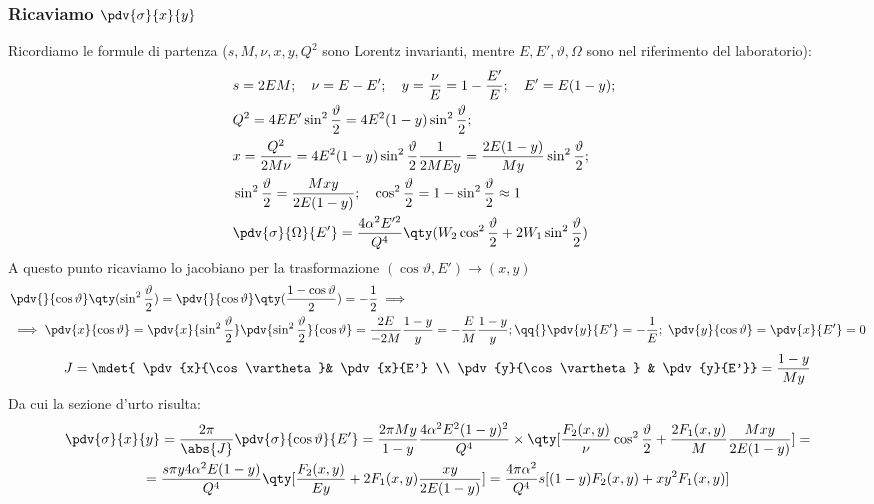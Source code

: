 \subsubsection{Ricaviamo $\pdv{\sigma}{x}{y}$}
Ricordiamo le formule di partenza ($s,M,\nu,x,y,Q^2$ sono Lorentz invarianti, mentre $E,E',\vartheta,\Omega$ sono nel riferimento del laboratorio):
\begin{align*}
&s=2EM;\quad\nu=E-E';\quad y=\frac{\nu}{E}=1-\frac{E'}{E};\quad E'=E(1-y);\\
&Q^2=4EE'\sin^2\frac{\vartheta}{2}=4E^2(1-y)\sin^2\frac{\vartheta}{2};\\
&x=\frac{Q^2}{2M\nu}=4E^2(1-y)\sin^2\frac{\vartheta}{2}\frac{1}{2MEy}=\frac{2E(1-y)}{My}\sin^2\frac{\vartheta}{2};\\
&\sin^2\frac{\vartheta}{2}=\frac{Mxy}{2E(1-y)};\quad\cos^2\frac{\vartheta}{2}=1-\sin^2\frac{\vartheta}{2}\approx1 \\
&\pdv{\sigma}{\Omega}{E'}=\frac{4\alpha^2E'^2}{Q^4}\qty(W_2\cos^2\frac{\vartheta}{2}+2W_1\sin^2\frac{\vartheta}{2})&&
\end{align*}
A questo punto ricaviamo lo jacobiano per la trasformazione $(\cos\vartheta,E')\to(x,y)$
\begin{align*}
&\pdv{}{\cos\vartheta}\qty(\sin^2\frac{\vartheta}{2})=\pdv{}{\cos\vartheta}\qty(\frac{1-\cos\vartheta}{2})=-\frac{1}{2}\implies\\
& \implies \pdv{x}{\cos\vartheta}=\pdv{x}{\sin^2\frac{\vartheta}{2}}\pdv{\sin^2\frac{\vartheta}{2}}{\cos\vartheta}=\frac{2E}{-2M}\frac{1-y}{y}=-\frac{E}{M}\frac{1-y}{y};\qq{} \pdv{y}{E'}=-\frac{1}{E};\;\pdv{y}{\cos\vartheta}=\pdv{x}{E'}=0
\end{align*}
\begin{equation*}
    J=\mdet{ \pdv{x}{\cos\vartheta}& \pdv{x}{E'} \\ \pdv{y}{\cos\vartheta} & \pdv{y}{E'}}=\frac{1-y}{My}
\end{equation*}
Da cui la sezione d'urto risulta:
\begin{gather*}
    \pdv{\sigma}{x}{y}=\frac{2\pi}{\abs{J}}\pdv{\sigma}{\cos\vartheta}{E'}=\frac{2\pi My}{1-y}\frac{4\alpha^2E^2(1-y)^2}{Q^4}\times\qty[\frac{F_2(x,y)}{\nu}\cos^2\frac{\vartheta}{2}+\frac{2F_1(x,y)}{M}\frac{Mxy}{2E(1-y)}]=\\
    =\frac{s\pi y4\alpha^2E(1-y)}{Q^4}\qty[\frac{F_2(x,y)}{Ey}+2F_1(x,y)\frac{xy}{2E(1-y)}]=\frac{4\pi \alpha^2}{Q^4}s[(1-y)F_2(x,y)+xy^2F_1(x,y)]
\end{gather*}
